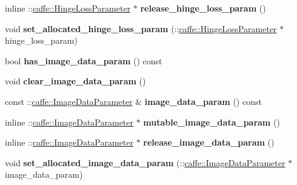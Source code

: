 \begin{DoxyCompactItemize}
inline \+::\mbox{\hyperlink{classcaffe_1_1_hinge_loss_parameter}{caffe\+::\+Hinge\+Loss\+Parameter}} $\ast$ {\bfseries release\+\_\+hinge\+\_\+loss\+\_\+param} ()
\item 
\mbox{\label{classcaffe_1_1_layer_parameter_ae7a7010d9a346e7c48c373249fc74004}} 
void {\bfseries set\+\_\+allocated\+\_\+hinge\+\_\+loss\+\_\+param} (\+::\mbox{\hyperlink{classcaffe_1_1_hinge_loss_parameter}{caffe\+::\+Hinge\+Loss\+Parameter}} $\ast$hinge\+\_\+loss\+\_\+param)
\item 
\mbox{\label{classcaffe_1_1_layer_parameter_a8ce4aff4b2c305699bf744c7b179cd78}} 
bool {\bfseries has\+\_\+image\+\_\+data\+\_\+param} () const
\item 
\mbox{\label{classcaffe_1_1_layer_parameter_acf0c30a7a19e7fc999037423b0af1ffb}} 
void {\bfseries clear\+\_\+image\+\_\+data\+\_\+param} ()
\item 
\mbox{\label{classcaffe_1_1_layer_parameter_a6c37c8ba6fb55e215ce27f3b65c14780}} 
const \+::\mbox{\hyperlink{classcaffe_1_1_image_data_parameter}{caffe\+::\+Image\+Data\+Parameter}} \& {\bfseries image\+\_\+data\+\_\+param} () const
\item 
\mbox{\label{classcaffe_1_1_layer_parameter_a5677517cdfc00ff745f7f9aefb0b93dd}} 
inline \+::\mbox{\hyperlink{classcaffe_1_1_image_data_parameter}{caffe\+::\+Image\+Data\+Parameter}} $\ast$ {\bfseries mutable\+\_\+image\+\_\+data\+\_\+param} ()
\item 
\mbox{\label{classcaffe_1_1_layer_parameter_a3eb9f91347e8342293567aa3e05ccb69}} 
inline \+::\mbox{\hyperlink{classcaffe_1_1_image_data_parameter}{caffe\+::\+Image\+Data\+Parameter}} $\ast$ {\bfseries release\+\_\+image\+\_\+data\+\_\+param} ()
\item 
\mbox{\label{classcaffe_1_1_layer_parameter_afb6ac92927feadfa7f138460e5f1d304}} 
void {\bfseries set\+\_\+allocated\+\_\+image\+\_\+data\+\_\+param} (\+::\mbox{\hyperlink{classcaffe_1_1_image_data_parameter}{caffe\+::\+Image\+Data\+Parameter}} $\ast$image\+\_\+data\+\_\+param)
\item 

\end{DoxyCompactItemize}

